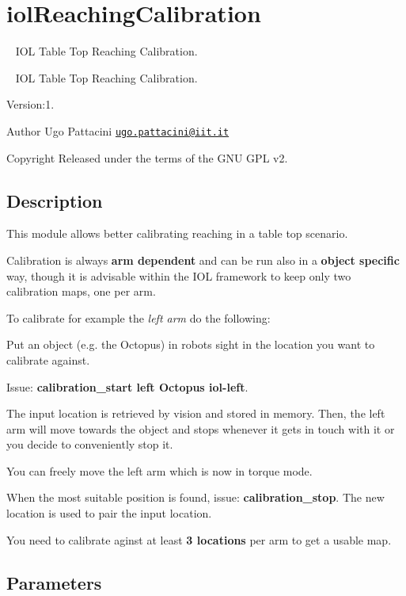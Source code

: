 \section{iol\+Reaching\+Calibration}
\label{group__iolReachingCalibration}


~\newline
 I\+OL Table Top Reaching Calibration.  


~\newline
 I\+OL Table Top Reaching Calibration. 

Version\+:1. \begin{DoxyAuthor}{Author}
Ugo Pattacini \href{mailto:ugo.pattacini@iit.it}{\tt ugo.\+pattacini@iit.\+it} ~\newline
 
\end{DoxyAuthor}
\begin{DoxyCopyright}{Copyright}
Released under the terms of the G\+NU G\+PL v2. 
\end{DoxyCopyright}
\hypertarget{group__iolReachingCalibration_intro_sec}{}\subsection{Description}\label{group__iolReachingCalibration_intro_sec}
This module allows better calibrating reaching in a table top scenario.

Calibration is always {\bfseries arm dependent} and can be run also in a {\bfseries object specific} way, though it is advisable within the I\+OL framework to keep only two calibration maps, one per arm.

To calibrate for example the {\itshape left arm} do the following\+:
\begin{DoxyItemize}
\item Put an object (e.\+g. the Octopus) in robot\textquotesingle{}s sight in the location you want to calibrate against.
\item Issue\+: {\bfseries calibration\+\_\+start left Octopus iol-\/left}.
\item The input location is retrieved by vision and stored in memory. Then, the left arm will move towards the object and stops whenever it gets in touch with it or you decide to conveniently stop it.
\item You can freely move the left arm which is now in torque mode.
\item When the most suitable position is found, issue\+: {\bfseries calibration\+\_\+stop}. The new location is used to pair the input location.
\item You need to calibrate aginst at least {\bfseries 3 locations} per arm to get a usable map.
\end{DoxyItemize}\hypertarget{group__iolReachingCalibration_parameters_sec}{}\subsection{Parameters}\label{group__iolReachingCalibration_parameters_sec}
~\newline

